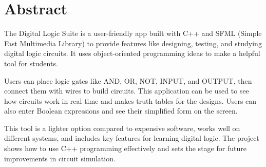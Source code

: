 \section*{Abstract}
The Digital Logic Suite is a user-friendly app built with C++ and SFML (Simple Fast Multimedia Library) to provide features like designing, testing, and studying digital logic circuits. It uses object-oriented programming ideas to make a helpful tool for students.

\vspace{0.5cm}
Users can place logic gates like AND, OR, NOT, INPUT, and OUTPUT, then connect them with wires to build circuits. This application can be used to see how circuits work in real time and makes truth tables for the designs. Users can also enter Boolean expressions and see their simplified form on the screen.

\vspace{0.5cm}
This tool is a lighter option compared to expensive software, works well on different systems, and includes key features for learning digital logic. The project shows how to use C++ programming effectively and sets the stage for future improvements in circuit simulation.
\clearpage